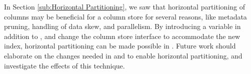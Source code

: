 In Section \ref{sub:Horizontal Partitioning}, we saw that horizontal partitioning of columns may be beneficial for a column store for several reasons, like metadata pruning, handling of data skew, and parallelism. By introducing a  variable in addition to , and change the column store interface to accommodate the new index, horizontal partitioning can be made possible in \gap. Future work should elaborate on the changes needed in  and  to enable horizontal partitioning, and investigate the effects of this technique.


